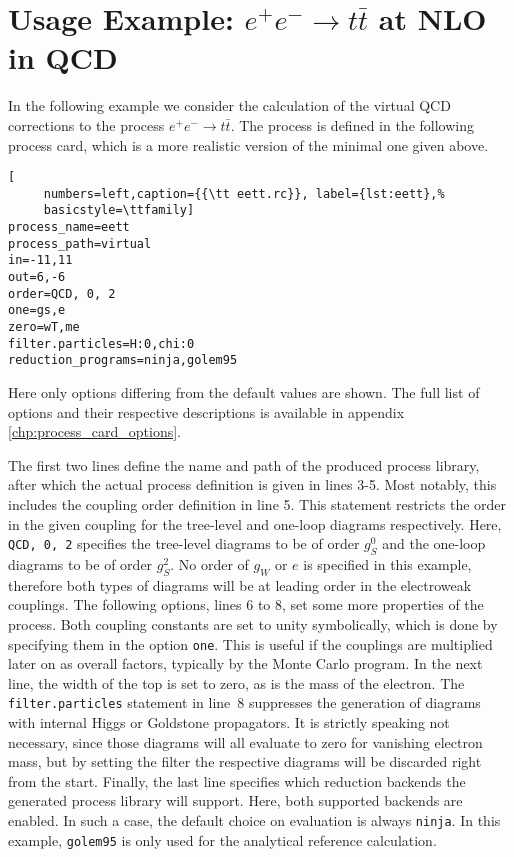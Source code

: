 \documentclass[11pt,a4paper]{refrep}
\begin{document}
\section{Usage Example: \texorpdfstring{$e^+e^-\rightarrow t\bar{t}$}{e+e- to tt-bar}
at NLO in QCD}
In the following example we consider the calculation of the virtual QCD corrections to the process $e^+e^-\rightarrow t\bar{t}$. The process is defined in the following process card, which is a more realistic version of the minimal one given above.

\begin{lstlisting}[
     numbers=left,caption={{\tt eett.rc}}, label={lst:eett},%
     basicstyle=\ttfamily] 
process_name=eett
process_path=virtual
in=-11,11
out=6,-6
order=QCD, 0, 2
one=gs,e
zero=wT,me
filter.particles=H:0,chi:0
reduction_programs=ninja,golem95
\end{lstlisting}

Here only options differing from the default values are shown. The full list of options and their respective descriptions is available in appendix \ref{chp:process_card_options}.

The first two lines define the name and path of the produced process library, after which the actual process definition is given in lines 3-5. Most notably, this includes the coupling order definition in line 5. This statement restricts the order in the given coupling for the tree-level and one-loop diagrams respectively. Here, \texttt{QCD, 0, 2} specifies the tree-level diagrams to be of order $g_S^0$ and the one-loop diagrams to be of order $g_S^2$. No order of $g_W$ or $e$ is specified in this example, therefore both types of diagrams will be at leading order in the electroweak couplings.
The following options, lines 6 to 8, set some more properties of the process. Both coupling constants are set to unity symbolically, which is done by specifying them in the option \texttt{one}. This is useful if the couplings are multiplied later on as overall factors, typically by the Monte Carlo program. In the next line, the width of the top is set to zero, as is the mass of the electron. The \texttt{filter.particles} statement in line~8 suppresses the generation of diagrams with internal Higgs or Goldstone propagators. It is strictly speaking not necessary, since those diagrams will all evaluate to zero for vanishing electron mass, but by setting the filter the respective diagrams will be discarded right from the start. Finally, the last line specifies which reduction backends the generated process library will support. Here, both supported backends are enabled. In such a case, the default choice on evaluation is always \texttt{ninja}. In this example, \texttt{golem95} is only used for the analytical reference calculation.
\end{document}
